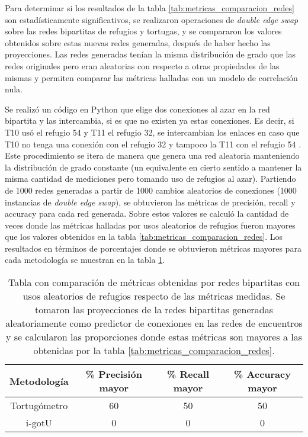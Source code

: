 Para determinar si los resultados de la tabla \ref{tab:metricas_comparacion_redes} son estadísticamente significativos, se realizaron operaciones de \textit{double edge swap} \cite{bipartitasTortusPaper} sobre las redes bipartitas de refugios y tortugas, y se compararon los valores obtenidos sobre estas nuevas redes generadas, después de haber hecho las proyecciones. Las redes generadas tenían la misma distribución de grado que las redes originales pero eran aleatorias con respecto a otras propiedades de las mismas y permiten comparar las métricas halladas con un modelo de correlación nula.
 
Se realizó un código en Python que elige dos conexiones al azar en la red bipartita y las intercambia, si es que no existen ya estas conexiones. Es decir, si T10 usó el refugio 54 y T11 el refugio 32, se intercambian los enlaces en caso que T10 no tenga una conexión con el refugio 32 y tampoco la T11 con el refugio 54 \cite{github}. Este procedimiento se itera de manera que genera una red aleatoria manteniendo la distribución de grado constante (un equivalente en cierto sentido a mantener la misma cantidad de mediciones pero tomando uso de refugios al azar). Partiendo de 1000 redes generadas a partir de 1000 cambios aleatorios de conexiones (1000 instancias de \textit{double edge swap}), se obtuvieron las métricas de precisión, recall y accuracy para cada red generada. Sobre estos valores se calculó la cantidad de veces donde las métricas halladas por usos aleatorios de refugios fueron mayores que los valores obtenidos  en la tabla \ref{tab:metricas_comparacion_redes}. Los resultados en términos de porcentajes donde se obtuvieron métricas mayores para cada metodología se muestran en la tabla \ref{tab:metricas_comparacion_redes_aleatorias}.
\begin{table}[ht]
    \centering
    \begin{tabular}{|c|c|c|c|}
       
   \hline
    Metodología  & \% Precisión mayor  &  \% Recall mayor & \% Accuracy mayor \\ \hline
    Tortugómetro & 60    & 50  & 50    \\ \hline
    i-gotU       & 0        & 0    & 0      \\ \hline
   
    \end{tabular}
    \caption[Tabla con comparación de métricas obtenidas en redes bipartitas con usos aleatorios de refugios respecto a las métricas medidas.]{Tabla con comparación de métricas obtenidas por redes bipartitas con usos aleatorios de refugios respecto de las métricas medidas. Se tomaron las proyecciones de la redes bipartitas generadas aleatoriamente como predictor de conexiones en las redes de encuentros y se calcularon las proporciones donde estas métricas son mayores a las obtenidas por la tabla \ref{tab:metricas_comparacion_redes}.}
    \label{tab:metricas_comparacion_redes_aleatorias}
\end{table}
 
